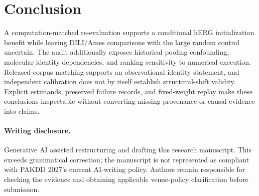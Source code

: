 \documentclass[runningheads,a4paper]{llncs}
\begin{document}
\section{Conclusion}
A computation-matched re-evaluation supports a conditional hERG initialization benefit while leaving DILI/Ames comparisons with the large random control uncertain. The audit additionally exposes historical pooling confounding, molecular identity dependencies, and ranking sensitivity to numerical execution. Released-corpus matching supports an observational identity statement, and independent calibration does not by itself establish structural-shift validity. Explicit estimands, preserved failure records, and fixed-weight replay make these conclusions inspectable without converting missing provenance or causal evidence into claims.

\paragraph{Writing disclosure.}
Generative AI assisted restructuring and drafting this research manuscript. This exceeds grammatical correction; the manuscript is not represented as compliant with PAKDD 2027's current AI-writing policy. Authors remain responsible for checking the evidence and obtaining applicable venue-policy clarification before submission.



\end{document}
